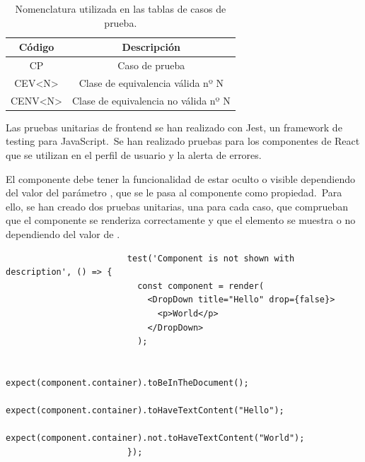 \begin{table}[H]
	\centering
	\caption{Nomenclatura utilizada en las tablas de casos de prueba.}
	\begin{tabular}{|c|c|}
		\hline
		\textbf{Código}           & \textbf{Descripción}                 \\ \hline
		CP                          & Caso de prueba                       \\ \hline
		CEV\textless N\textgreater  & Clase de equivalencia válida nº N    \\ \hline
		CENV\textless N\textgreater & Clase de equivalencia no válida nº N \\ \hline
	\end{tabular}
	\label{tab:nomenclatura-casos-prueba-caja-negra}
\end{table}


Las pruebas unitarias de frontend se han realizado con Jest, un framework de testing para JavaScript.\ Se han
realizado pruebas para los componentes de React que se utilizan en el perfil de usuario y la alerta de errores.

El componente  debe tener la funcionalidad de estar oculto o visible dependiendo del valor del
parámetro , que se le pasa al componente como propiedad.\ Para ello, se han creado dos pruebas unitarias,
una para cada caso, que comprueban que el componente se renderiza correctamente y que el elemento  se
muestra o no dependiendo del valor de .

\begin{codeBlock}
	\begin{verbatim}
						test('Component is not shown with description', () => {
						  const component = render(
						    <DropDown title="Hello" drop={false}>
						      <p>World</p>
						    </DropDown>
						  );

						  expect(component.container).toBeInTheDocument();
						  expect(component.container).toHaveTextContent("Hello");
						  expect(component.container).not.toHaveTextContent("World");
						});
	\end{verbatim}
	\caption{Prueba unitaria para el componente DropDown cuando  es .}
	\label{code:prueba-unitaria-dropdown-false}
\end{codeBlock}

